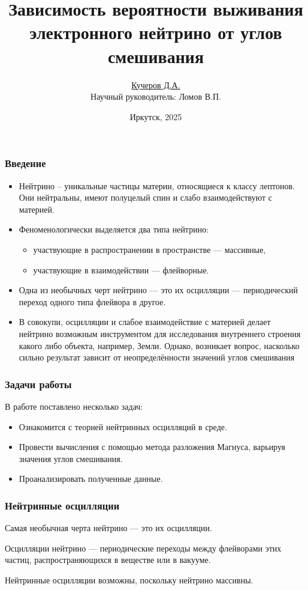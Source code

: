\documentclass[utf8,9pt,mathserif,usepdftitle=false]{beamer}
\title{Зависимость вероятности выживания электронного нейтрино от углов
  смешивания}%
\author{\underline{Кучеров Д.А.}\\[7em]\raggedleft\footnotesize Научный руководитель:
  Ломов В.П.\\%
}%
\date[ИГУ, 2025]{\vfill%
  \small{}Иркутск, 2025}
\begin{document}
\begin{frame}
  \titlepage
\end{frame}

\begin{frame}
	\frametitle{Введение}
	\begin{itemize}
		\item<1-> Нейтрино -- уникальные частицы материи, относящиеся к классу лептонов. Они 
		нейтральны, имеют полуцелый спин и слабо взаимодействуют с материей. 
		\item<2-> Феноменологически выделяется два типа нейтрино: 
		\begin{itemize}
			\item<2-> участвующие в распространении в пространстве --- массивные, 
			\item<2-> участвующие в взаимодействии --- флейворные.
		\end{itemize}
		\item<3-> Одна из необычных черт нейтрино --- это их осцилляции --- периодический 
		переход одного типа флейвора в другое.
		\item<4-> В совокупи, осцилляции и слабое взаимодействие с материей делает нейтрино 
		возможным инструментом для исследования внутреннего строения какого либо 
		объекта, например, Земли. Однако, возникает вопрос, насколько сильно результат 
		зависит от неопределённости значений углов смешивания  
	\end{itemize}
	
\end{frame}

\begin{frame}
	\frametitle{Задачи работы}
  В работе поставлено несколько задач:
  \begin{itemize}
  \item<2-> Ознакомится с теорией нейтринных осцилляций в среде.
  \item<3-> Провести вычисления с помощью метода разложения Магнуса, варьируя
    значения углов смешивания.
  \item<4-> Проанализировать полученные данные.
  \end{itemize}
\end{frame}

\begin{frame}
	\frametitle{Нейтринные осцилляции}%
	Самая необычная черта нейтрино — это их осцилляции.

  Осцилляции нейтрино — периодические переходы между флейворами этих частиц,
  распространяющихся в веществе или в вакууме.

  Нейтринные осцилляции возможны, поскольку нейтрино массивны.%
\end{frame}
\end{document}
